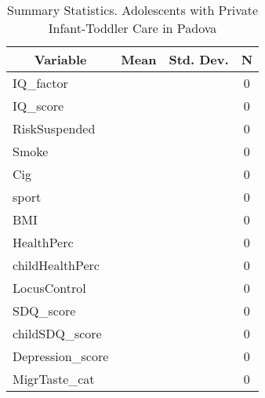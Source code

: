 
\begin{table}[htbp]\centering \caption{Summary Statistics. Adolescents with Private Infant-Toddler Care in Padova \label{bothAdolasiloPrivPadova}}
\begin{tabular}{l c c  c}\hline\hline
\multicolumn{1}{c}{\textbf{Variable}} & \textbf{Mean}
 & \textbf{Std. Dev.} & \textbf{N}\\ \hline
IQ\_factor &  &   & 0\\
IQ\_score &  &   & 0\\
RiskSuspended &  &   & 0\\
Smoke &  &   & 0\\
Cig &  &   & 0\\
sport &  &   & 0\\
BMI &  &   & 0\\
HealthPerc &  &   & 0\\
childHealthPerc &  &   & 0\\
LocusControl &  &   & 0\\
SDQ\_score &  &   & 0\\
childSDQ\_score &  &   & 0\\
Depression\_score &  &   & 0\\
MigrTaste\_cat &  &   & 0\\
\hline\end{tabular}
\end{table}
